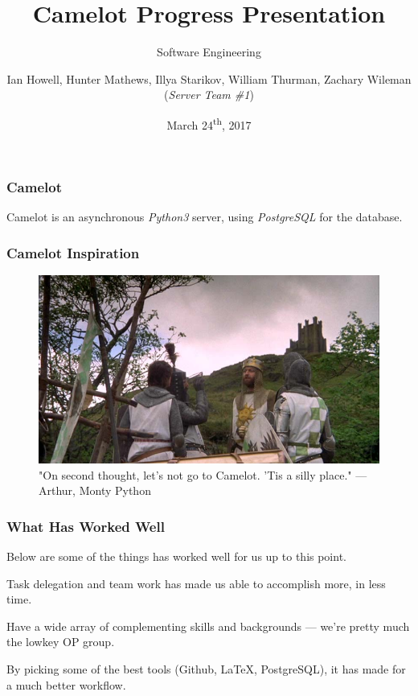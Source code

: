 \documentclass{beamer}
\title{Camelot Progress Presentation}
\subtitle{Software Engineering}
\author{Ian Howell, Hunter Mathews, Illya Starikov, William Thurman, Zachary Wileman (\textit{Server Team \#1})}
\date{March 24\textsuperscript{th}, 2017}
\institute{Missouri University of Science and Technology}
\newcounter{tools}
\begin{document}
\maketitle


\begin{frame}
    \frametitle{Camelot}

    Camelot is an asynchronous \textit{Python3} server, using \textit{PostgreSQL} for the database.
\end{frame}


\begin{frame}
    \frametitle{Camelot Inspiration}

    \begin{figure}
        \centering
        \includegraphics[width=\textwidth]{images/camelot}
        \caption{"On second thought, let's not go to Camelot. 'Tis a silly place." — Arthur, Monty Python}
        \label{fig:camelot}
    \end{figure}
\end{frame}


\begin{frame}
    \frametitle{What Has Worked Well}
    Below are some of the things has worked well for us up to this point.

    \begin{description}[<+->]
        \item[Teamwork] Task delegation and team work has made us able to accomplish more, in less time.
        \item[Teammates] Have a wide array of complementing skills and backgrounds --- we're pretty much the lowkey OP group.
        \item[Tools] By picking some of the best tools (Github, \LaTeX{}, PostgreSQL), it has made for a much better workflow.
    \end{description}
\end{frame}
\end{document}
